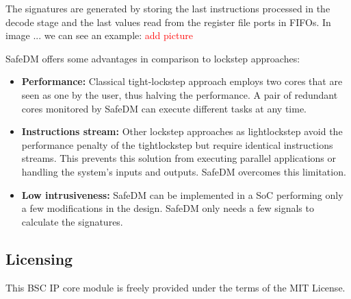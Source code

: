 The signatures are generated by storing the last instructions processed in the decode stage and the last values read from the register file ports in FIFOs. In image ... we can see an example: \textcolor{red}{add picture}

SafeDM offers some advantages in comparison to lockstep approaches:
\begin{itemize}
	\item \textbf{Performance:} Classical tight-lockstep approach employs two cores that are seen as one by the user, thus halving the performance. A pair of redundant cores monitored by SafeDM can execute different tasks at any time.
	\item \textbf{Instructions stream:} Other lockstep approaches as light\-lockstep avoid the performance penalty of the tight\-lockstep but require identical instructions streams. This prevents this solution from executing parallel applications or handling the system's inputs and outputs. SafeDM overcomes this limitation.
    \item \textbf{Low intrusiveness:} SafeDM can be implemented in a SoC performing only a few modifications in the design. SafeDM only needs a few signals to calculate the signatures.
\end{itemize}



\subsection{Licensing}

This BSC IP core module is freely provided under the terms of the MIT License.



\hspace{5cm}
